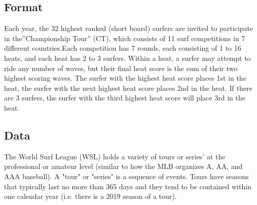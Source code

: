 \documentclass{article}
\begin{document}
\subsection{Format}
Each year, the 32 highest ranked (short board) surfers are invited to participate in the”Championship Tour” (CT), which consists of 11 surf competitions in 7 different countries.Each competition has 7 rounds, each consisting of 1 to 16 heats, and each heat has 2 to 3 surfers. Within a heat, a surfer may attempt to ride any number of waves, but their final heat score is the sum of their two highest scoring waves. The surfer with the highest heat score places 1st in the heat, the surfer with the next highest heat score places 2nd in the heat. If there are 3 surfers, the surfer with the third highest heat score will place 3rd in the heat.
\subsection{Data}
The World Surf League (WSL) holds a variety of tours or series' at the professional or amateur level (similar to how the MLB organizes A, AA, and AAA baseball). A "tour" or "series" is a sequence of events. Tours have seasons that typically last no more than 365 days and they tend to be contained within one calendar year (i.e. there is a 2019 season of a tour).
\end{document}
